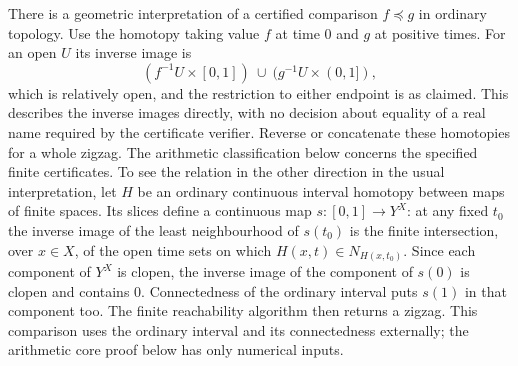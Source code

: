 There is a geometric interpretation of a certified comparison $f\preceq g$
in ordinary topology. Use the homotopy taking value $f$ at time $0$ and
$g$ at positive times. For an open $U$ its inverse image is
\[
  (f^{-1}U\times[0,1])\ \cup\ (g^{-1}U\times(0,1]),
\]
which is relatively open, and the restriction to either endpoint is as
claimed. This describes the inverse images directly, with no decision about
equality of a real name required by the certificate verifier. Reverse or
concatenate these homotopies for a whole zigzag. The arithmetic
classification below concerns the specified finite certificates. To see the
relation in the other direction in the usual interpretation, let $H$ be an
ordinary continuous interval homotopy between maps of finite spaces. Its
slices define a continuous map $s:[0,1]\to Y^X$: at any fixed $t_0$ the
inverse image of the least neighbourhood of $s(t_0)$ is the finite
intersection, over $x\in X$, of the open time sets on which
$H(x,t)\in N_{H(x,t_0)}$. Since each component of $Y^X$ is clopen,
the inverse image of the component of $s(0)$ is clopen and contains $0$.
Connectedness of the ordinary interval puts $s(1)$ in that component too.
The finite reachability algorithm then returns a zigzag. This comparison
uses the ordinary interval and its connectedness externally; the arithmetic
core proof below has only numerical inputs.


